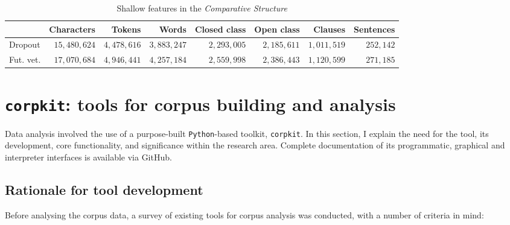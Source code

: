 \begin{table}[htb]
\centering
\footnotesize
\begin{tabular}{lrrrrrrr}

\toprule
{} &  Characters &   Tokens &    Words &  Closed class &  Open class &  Clauses &  Sentences \\
\midrule
Dropout        &    $15,480,624$ &  $4,478,616$ &  $3,883,247$ &  $2,293,005$ &           $2,185,611$ &  $1,011,519$ &     $252,142$ \\
Fut. vet. &    $17,070,684$ &  $4,946,441$ &  $4,257,184$ &  $2,559,998$ &           $2,386,443$ &  $1,120,599$ &     $271,185$ \\
\bottomrule
\end{tabular}
\caption{Shallow features in the \emph{Comparative Structure}}
\label{tab:shallow_C}
\end{table}


\section{\texttt{corpkit}: tools for corpus building and analysis} \label{sect:corpkit}

Data analysis involved the use of a purpose\hyp{}built \texttt{Python}\hyp{}based toolkit, \texttt{corpkit}. In this section, I explain the need for the tool, its development, core functionality, and significance within the research area. Complete documentation of its programmatic, graphical and interpreter interfaces is available via GitHub.

\subsection{Rationale for tool development}

Before analysing the \gls{corpus} data, a survey of existing tools for corpus analysis was conducted, with a number of criteria in mind:

